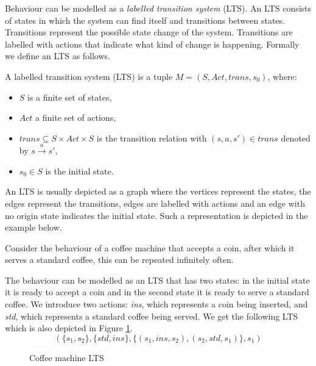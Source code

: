 Behaviour can be modelled as a \textit{labelled transition system} (LTS). An LTS consists of states in which the system can find itself and transitions between states. Transitions represent the possible state change of the system. Transitions are labelled with actions that indicate what kind of change is happening. Formally we define an LTS as follows.
\begin{definition}
	\label{def_lts}
	A labelled transition system (LTS) is a tuple $M = (S, Act, trans, s_0)$, where:
	\begin{itemize}
		\item $S$ is a finite set of states,
		\item $Act$ a finite set of actions,
		\item $trans \subseteq S \times Act \times S$ is the transition relation with $(s,a,s') \in trans$ denoted by $s \xrightarrow a s'$,
		\item $s_0 \in S$ is the initial state.
	\end{itemize}
\end{definition}

An LTS is usually depicted as a graph where the vertices represent the states, the edges represent the transitions, edges are labelled with actions and an edge with no origin state indicates the initial state. Such a representation is depicted in the example below.
\begin{example}
	Consider the behaviour of a coffee machine that accepts a coin, after which it serves a standard coffee, this can be repeated infinitely often. 
	
	The behaviour can be modelled as an LTS that has two states: in the initial state it is ready to accept a coin and in the second state it is ready to serve a standard coffee. We introduce two actions: \textit{ins}, which represents a coin being inserted, and \textit{std}, which represents a standard coffee being served. We get the following LTS which is also depicted in Figure \ref{fig:coffeemachinebasiceurolts}.
	\[ (\{s_1,s_2\},\{std,ins\},\{(s_1,ins,s_2),(s_2,std,s_1)\},s_1)\]
	\begin{figure}[h]
		\centering
		\caption[Coffee machine LTS]{Coffee machine LTS}
		\label{fig:coffeemachinebasiceurolts}
	\end{figure}
\end{example}

